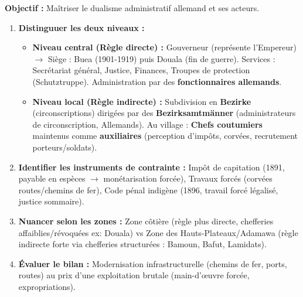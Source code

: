 \documentclass[11pt]{article}
\newcommand{\cle}[1]{{\popxbold\color{popdark}#1}}
\begin{document}
\begin{methode}
\textbf{Objectif :} Maîtriser le dualisme administratif allemand et ses acteurs.
\begin{enumerate}
    \item \textbf{Distinguuer les deux niveaux :}
    \begin{itemize}
        \item \textbf{Niveau central (Règle directe) :} Gouverneur (représente l'Empereur) $\rightarrow$ Siège : Buea (1901-1919) puis Douala (fin de guerre). Services : Secrétariat général, Justice, Finances, Troupes de protection (\cle{Schutztruppe}). Administration par des \textbf{fonctionnaires allemands}.
        \item \textbf{Niveau local (Règle indirecte) :} Subdivision en \textbf{Bezirke} (circonscriptions) dirigées par des \textbf{Bezirksamtmänner} (administrateurs de circonscription, Allemands). Au village : \textbf{Chefs coutumiers} maintenus comme \textbf{auxiliaires} (perception d'impôts, corvées, recrutement porteurs/soldats).
    \end{itemize}
    \item \textbf{Identifier les instruments de contrainte :} \cle{Impôt de capitation} (1891, payable en espèces $\rightarrow$ monétarisation forcée), \cle{Travaux forcés} (corvées routes/chemins de fer), \cle{Code pénal indigène} (1896, travail forcé légalisé, justice sommaire).
    \item \textbf{Nuancer selon les zones :} Zone côtière (règle plus directe, chefferies affaiblies/révoquées ex: Douala) vs Zone des Hauts-Plateaux/Adamawa (règle indirecte forte via chefferies structurées : Bamoun, Bafut, Lamidats).
    \item \textbf{Évaluer le bilan :} Modernisation infrastructurelle (chemins de fer, ports, routes) au prix d'une exploitation brutale (main-d'œuvre forcée, expropriations).
\end{enumerate}
\end{methode}
\end{document}
